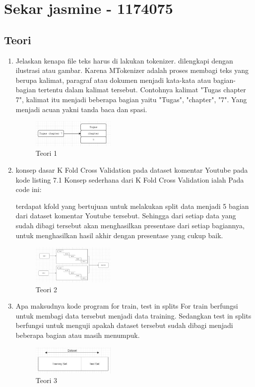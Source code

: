 \section{Sekar jasmine - 1174075}
\subsection{Teori}
\begin{enumerate}


\item Jelaskan kenapa file teks harus di lakukan tokenizer. dilengkapi dengan ilustrasi atau gambar.
	\hfill\break
Karena MTokenizer adalah proses membagi teks yang berupa kalimat, paragraf atau dokumen menjadi kata-kata atau bagian-bagian tertentu dalam kalimat tersebut. Contohnya kalimat "Tugas chapter 7", kalimat itu menjadi beberapa bagian yaitu "Tugas", "chapter", "7". Yang menjadi acuan yakni tanda baca dan spasi.
\begin{figure}[H]
\centering
	\includegraphics[width=4cm]{figures/1174075/7/1.jpg}
\caption{Teori 1}
\end{figure}

\item konsep dasar K Fold Cross Validation pada dataset komentar Youtube pada kode listing 7.1
	\hfill\break
Konsep sederhana dari K Fold Cross Validation ialah Pada code ini:

terdapat kfold yang bertujuan untuk melakukan split data menjadi 5 bagian dari dataset komentar Youtube tersebut. Sehingga dari setiap data yang sudah dibagi tersebut akan menghasilkan presentase dari setiap bagiannya, untuk menghasilkan hasil akhir dengan presentase yang cukup baik.
\begin{figure}[H]
\centering
	\includegraphics[width=4cm]{figures/1174075/7/2.jpg}
\caption{Teori 2}
\end{figure}

\item Apa maksudnya kode program for train, test in splits
\hfill\break
For train berfungsi untuk membagi data tersebut menjadi data training. Sedangkan test in splits berfungsi untuk menguji apakah dataset tersebut sudah dibagi menjadi beberapa bagian atau masih menumpuk.
\begin{figure}[H]
\centering
	\includegraphics[width=4cm]{figures/1174075/7/3.jpg}
\caption{Teori 3}
\end{figure}


\end{enumerate}
